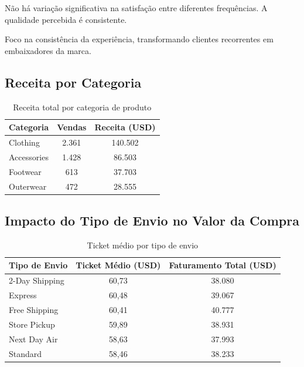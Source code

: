 \documentclass[12pt,a4paper]{article}
\begin{document}
\begin{insightbox}
Não há variação significativa na satisfação entre diferentes frequências. A qualidade percebida é consistente.
\end{insightbox}
\begin{actionbox}
Foco na consistência da experiência, transformando clientes recorrentes em embaixadores da marca.
\end{actionbox}

\subsection{Receita por Categoria}
\begin{table}[H]
\centering
\caption{Receita total por categoria de produto}
\label{tab:receita_categoria}
\begin{tabular}{lcc}
\toprule
\rowcolor{lightgray} \textbf{Categoria} & \textbf{Vendas} & \textbf{Receita (USD)} \\
\midrule
Clothing    & 2.361 & 140.502 \\
Accessories & 1.428 & 86.503 \\
Footwear    & 613   & 37.703 \\
Outerwear   & 472   & 28.555 \\
\bottomrule
\end{tabular}
\end{table}

\subsection{Impacto do Tipo de Envio no Valor da Compra}
\begin{table}[H]
\centering
\caption{Ticket médio por tipo de envio}
\label{tab:shipping}
\begin{tabular}{lcc}
\toprule
\rowcolor{lightgray} \textbf{Tipo de Envio} & \textbf{Ticket Médio (USD)} & \textbf{Faturamento Total (USD)} \\
\midrule
2-Day Shipping  & 60,73 & 38.080 \\
Express         & 60,48 & 39.067 \\
Free Shipping   & 60,41 & 40.777 \\
Store Pickup    & 59,89 & 38.931 \\
Next Day Air    & 58,63 & 37.993 \\
Standard        & 58,46 & 38.233 \\
\bottomrule
\end{tabular}
\end{table}
\end{document}
